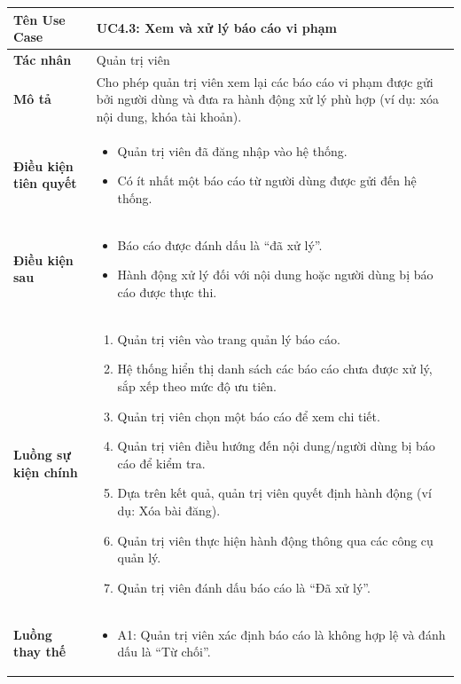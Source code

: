 \begin{table}[H]
\centering
\begin{tabularx}{\textwidth}{|l|X|}
\hline
\textbf{Tên Use Case} & \textbf{UC4.3: Xem và xử lý báo cáo vi phạm} \\ \hline
\textbf{Tác nhân} & Quản trị viên \\ \hline
\textbf{Mô tả} & Cho phép quản trị viên xem lại các báo cáo vi phạm được gửi bởi người dùng và đưa ra hành động xử lý phù hợp (ví dụ: xóa nội dung, khóa tài khoản). \\ \hline
\textbf{Điều kiện tiên quyết} & 
\begin{itemize}
    \item Quản trị viên đã đăng nhập vào hệ thống.
    \item Có ít nhất một báo cáo từ người dùng được gửi đến hệ thống.
\end{itemize} \\ \hline
\textbf{Điều kiện sau} & 
\begin{itemize}
    \item Báo cáo được đánh dấu là ``đã xử lý''.
    \item Hành động xử lý đối với nội dung hoặc người dùng bị báo cáo được thực thi.
\end{itemize} \\ \hline
\textbf{Luồng sự kiện chính} & 
\begin{enumerate}
    \item Quản trị viên vào trang quản lý báo cáo.
    \item Hệ thống hiển thị danh sách các báo cáo chưa được xử lý, sắp xếp theo mức độ ưu tiên.
    \item Quản trị viên chọn một báo cáo để xem chi tiết.
    \item Quản trị viên điều hướng đến nội dung/người dùng bị báo cáo để kiểm tra.
    \item Dựa trên kết quả, quản trị viên quyết định hành động (ví dụ: Xóa bài đăng).
    \item Quản trị viên thực hiện hành động thông qua các công cụ quản lý.
    \item Quản trị viên đánh dấu báo cáo là ``Đã xử lý''.
\end{enumerate} \\ \hline
\textbf{Luồng thay thế} & 
\begin{itemize}
    \item A1: Quản trị viên xác định báo cáo là không hợp lệ và đánh dấu là ``Từ chối''.

\end{itemize}
\end{tabularx}
\end{table}
